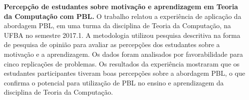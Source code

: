 \item{\textbf{Percepção de estudantes sobre
motivação e aprendizagem em Teoria da
Computação com \ac{PBL}.}
O trabalho relatou a experiência de aplicação da abordagem
\ac{PBL}, em uma turma da disciplina de Teoria da Computação, na
\ac{UFBA} no semestre 2017.1.
A metodologia utilizou pesquisa descritiva na forma de pesquisa
de opinião para avaliar as percepções dos estudantes sobre
a motivação e a aprendizagem.
Os dados foram analisados por favorabilidade para cinco
replicações de problemas.
Os resultados da experiência mostraram que os estudantes
participantes tiveram boas percepções sobre a abordagem \ac{PBL},
o que confirma o potencial para utilização de \ac{PBL}
no ensino e aprendizagem da disciplina de Teoria
da Computação.}
